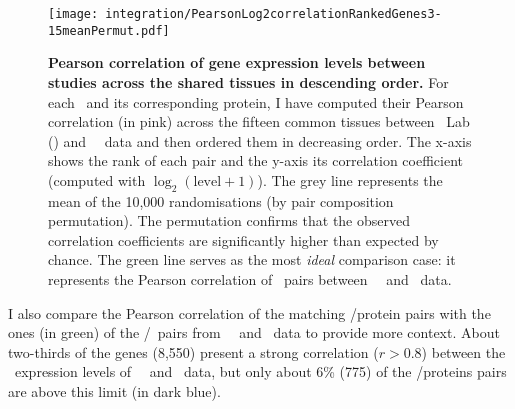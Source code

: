 \begin{figure}[!htb]
    \texttt{[image: integration/PearsonLog2correlationRankedGenes3-15meanPermut.pdf]}\centering
    \vspace{-3mm}
    \caption[Pearson correlation coefficients of gene expression levels
    between studies in descending order]%
    {\label{fig:GeneProtCor}\textbf{Pearson correlation of gene expression levels
    between studies across the shared tissues in descending order.}
    For each \mRNA\ and its corresponding protein,
    I have computed their Pearson correlation (in pink)
    across the fifteen common tissues
    between \pandey\ Lab (\PPKM) and \uhlen\ \etal\ data
    and then ordered them in decreasing order.
    The x-axis shows the rank of each pair
    and the y-axis its correlation coefficient
    (computed with $\log_2(\text{level}+1)$).
    The grey line represents the mean of the 10,000 randomisations
    (by pair composition permutation).
    The permutation confirms that the observed correlation coefficients are
    significantly higher than expected by chance.
    The green line serves as the most \emph{ideal} comparison case:
    it represents the Pearson correlation of \mRNAs\ pairs
    between \uhlen\ \etal\ and \gtex\ data.
    }
    \vspace{-1em}
\end{figure}

I also compare the Pearson correlation of the matching \mRNAs/protein pairs
with the ones (in green) of the \mRNAs{}/\mRNAs\ pairs
from \uhlen\ \etal\ and \gtex\ data
to provide more context.
About two-thirds of the genes (8,550) present a strong correlation
($r>0.8$)
between the \mRNA\ expression levels of \uhlen\ \etal\ and \gtex\ data,
but only about 6\% (775) of the \mRNA/proteins pairs are above this limit
(in dark blue).\mybr\

